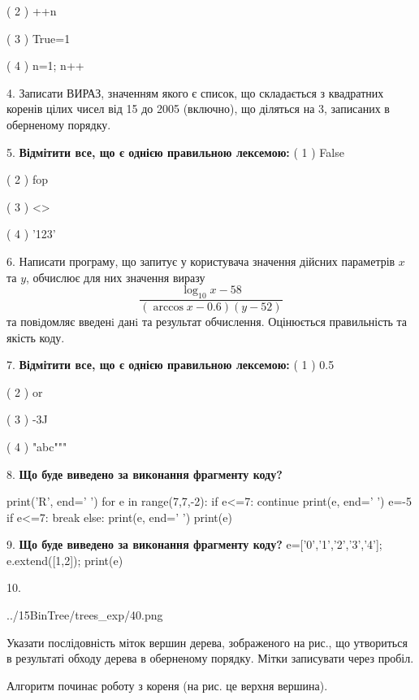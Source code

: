 \documentclass[11pt]{article}
\begin{document}
( 2 ) ++n

( 3 ) True=1

( 4 ) n=1; n++
\par\vspace{5mm}
4. 
Записати ВИРАЗ, значенням якого є список, що складається з квадратних коренів цілих чисел від 15 до 2005 (включно), що діляться на 3, записаних в оберненому порядку.\par\vspace{5mm}
5. %
\textbf{Відмітити все, що є однією правильною лексемою:}
( 1 ) False

( 2 ) fop

( 3 ) <>

( 4 ) '123'
\par\vspace{5mm}
6. 
Написати програму, що запитує у користувача значення дійсних параметрів $x$ та $y$, обчислює для них значення виразу 
$$\frac{\log_{10} x - 58}{(\arccos x - 0.6) (y - 52)}$$ 
та повiдомляє введенi данi та результат обчислення.
 Оцінюється правильність та якість коду.

\par\vspace{5mm}
7. %
\textbf{Відмітити все, що є однією правильною лексемою:}
( 1 ) 0.5

( 2 ) or

( 3 ) -3J

( 4 ) "abc"""
\par\vspace{5mm}
8. \textbf{Що буде виведено за виконання фрагменту коду?}

print('R', end=' ')
for e in range(7,7,-2):
    if e<=7:
        continue
        print(e, end=' ')
        e=-5
    if e<=7:
        break
    else:
        print(e, end=' ')
    print(e)
\par\vspace{5mm}
9. \textbf{Що буде виведено за виконання фрагменту коду?}
e=['0','1','2','3','4']; e.extend([1,2]); print(e)\par\vspace{5mm}
10. 

\begin{center}
	{../15BinTree/trees_exp/40.png}
\end{center}
Указати послідовність міток вершин дерева, зображеного на рис., що утвориться в результаті обходу дерева в оберненому порядку. Мітки записувати через пробіл.\par Алгоритм починає роботу з кореня (на рис. це верхня вершина).
\par\vspace{5mm}










\newpage
\end{document}
